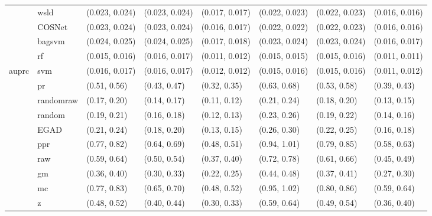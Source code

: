 \begin{table}[H]
{\begin{tabular}{llllllll}
 & wsld & (0.023, 0.024) & (0.023, 0.024) & (0.017, 0.017) & (0.022, 0.023) & (0.022, 0.023) & (0.016, 0.016)\\

 & COSNet & (0.023, 0.024) & (0.023, 0.024) & (0.016, 0.017) & (0.022, 0.022) & (0.022, 0.023) & (0.016, 0.016)\\

 & bagsvm & (0.024, 0.025) & (0.024, 0.025) & (0.017, 0.018) & (0.023, 0.024) & (0.023, 0.024) & (0.016, 0.017)\\

 & rf & (0.015, 0.016) & (0.016, 0.017) & (0.011, 0.012) & (0.015, 0.015) & (0.015, 0.016) & (0.011, 0.011)\\

\multirow{-15}{*}{\raggedright\arraybackslash auprc} & svm & (0.016, 0.017) & (0.016, 0.017) & (0.012, 0.012) & (0.015, 0.016) & (0.015, 0.016) & (0.011, 0.012)\\
\cmidrule{1-8}
 & pr & (0.51, 0.56) & (0.43, 0.47) & (0.32, 0.35) & (0.63, 0.68) & (0.53, 0.58) & (0.39, 0.43)\\

 & randomraw & (0.17, 0.20) & (0.14, 0.17) & (0.11, 0.12) & (0.21, 0.24) & (0.18, 0.20) & (0.13, 0.15)\\

 & random & (0.19, 0.21) & (0.16, 0.18) & (0.12, 0.13) & (0.23, 0.26) & (0.19, 0.22) & (0.14, 0.16)\\

 & EGAD & (0.21, 0.24) & (0.18, 0.20) & (0.13, 0.15) & (0.26, 0.30) & (0.22, 0.25) & (0.16, 0.18)\\

 & ppr & (0.77, 0.82) & (0.64, 0.69) & (0.48, 0.51) & (0.94, 1.01) & (0.79, 0.85) & (0.58, 0.63)\\

 & raw & (0.59, 0.64) & (0.50, 0.54) & (0.37, 0.40) & (0.72, 0.78) & (0.61, 0.66) & (0.45, 0.49)\\

 & gm & (0.36, 0.40) & (0.30, 0.33) & (0.22, 0.25) & (0.44, 0.48) & (0.37, 0.41) & (0.27, 0.30)\\

 & mc & (0.77, 0.83) & (0.65, 0.70) & (0.48, 0.52) & (0.95, 1.02) & (0.80, 0.86) & (0.59, 0.64)\\

 & z & (0.48, 0.52) & (0.40, 0.44) & (0.30, 0.33) & (0.59, 0.64) & (0.49, 0.54) & (0.36, 0.40)\\


\end{tabular}}
\end{table}
